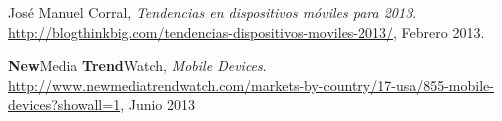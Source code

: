 \begin{thebibliography}{99} 
    Jos\'e Manuel Corral,
    \emph{Tendencias en dispositivos m\'oviles para 2013}.
    \url{http://blogthinkbig.com/tendencias-dispositivos-moviles-2013/},
    Febrero 2013.

    \textbf{New}Media \textbf{Trend}Watch,
    \emph{Mobile {D}evices}.
    \url{http://www.newmediatrendwatch.com/markets-by-country/17-usa/855-mobile-devices?showall=1},
    Junio 2013
\end{thebibliography}

